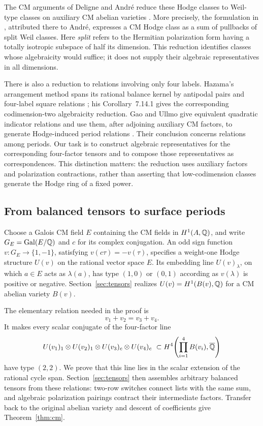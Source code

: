 The CM arguments of Deligne and Andr\'e reduce these Hodge classes to
Weil-type classes on auxiliary CM abelian varieties
\cite{Deligne1982,Andre1992}.  More precisely, the formulation in
\cite[Theorem~1]{Milne2022}, attributed there to Andr\'e, expresses a
CM Hodge class as a sum of pullbacks of split Weil classes.  Here
\emph{split} refers to the Hermitian polarization form having a totally
isotropic subspace of half its dimension.  This reduction identifies
classes whose algebraicity would suffice; it does not supply their
algebraic representatives in all dimensions.

There is also a reduction to relations involving only four labels.
Hazama's arrangement method spans its rational balance kernel by
antipodal pairs and four-label square relations
\cite[Theorem~7.13]{Hazama2003CM}; his Corollary~7.14.1 gives the
corresponding codimension-two algebraicity reduction.  Gao and Ullmo
give equivalent quadratic indicator relations and use them, after
adjoining auxiliary CM factors, to generate Hodge-induced period
relations \cite[Theorems~7.1--7.2]{GaoUllmo2026}.
Their conclusion concerns relations among periods.  Our task is to
construct algebraic representatives for the corresponding four-factor
tensors and to compose those representatives as correspondences.
This distinction matters: the reduction uses auxiliary factors and
polarization contractions, rather than asserting that low-codimension
classes generate the Hodge ring of a fixed power.

\subsection{From balanced tensors to surface periods}

Choose a Galois CM field \(E\) containing the CM fields in
\(H^1(A,\mathbb{Q})\), and write \(G_E=\operatorname{Gal}(E/\mathbb{Q})\) and \(c\) for its
complex conjugation.  An odd sign function
\(v:G_E\to\{1,-1\}\), satisfying \(v(c\tau)=-v(\tau)\), specifies
a weight-one Hodge structure \(U(v)\) on the rational vector space
\(E\).  Its embedding line \(U(v)_\lambda\), on which \(a\in E\)
acts as \(\lambda(a)\), has type \((1,0)\) or \((0,1)\) according
as \(v(\lambda)\) is positive or negative.
Section~\ref{sec:tensors} realizes \(U(v)=H^1(B(v),\mathbb{Q})\) for a CM
abelian variety \(B(v)\).

The elementary relation needed in the proof is
\[
 v_1+v_2=v_3+v_4.
\]
It makes every scalar conjugate of the four-factor line
\[
 U(v_1)_1\otimes U(v_2)_1\otimes U(v_3)_c\otimes U(v_4)_c
 \ \subset H^4\!\left(\prod_{i=1}^4B(v_i),\overline{\mathbb{Q}}\right)
\]
have type \((2,2)\).  We prove that this line lies in the scalar
extension of the rational cycle span.  Section~\ref{sec:tensors}
then assembles arbitrary balanced tensors from these relations:
two-row switches connect lists with the same sum, and algebraic
polarization pairings contract their intermediate factors.  Transfer
back to the original abelian variety and descent of coefficients
give Theorem~\ref{thm:cm}.

